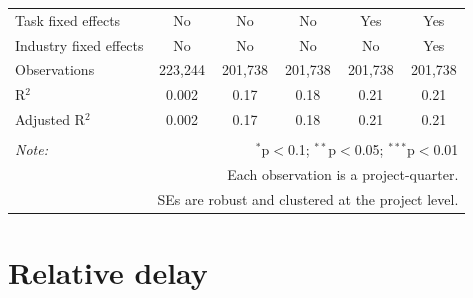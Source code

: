 \documentclass[
]{article}
\begin{document}
\begin{table}[H]
\begin{tabular}{@{\extracolsep{-2pt}}lccccc}
Task fixed effects & No & No & No & Yes & Yes \\ 
Industry fixed effects & No & No & No & No & Yes \\ 
Observations & 223,244 & 201,738 & 201,738 & 201,738 & 201,738 \\ 
R$^{2}$ & 0.002 & 0.17 & 0.18 & 0.21 & 0.21 \\ 
Adjusted R$^{2}$ & 0.002 & 0.17 & 0.18 & 0.21 & 0.21 \\ 
\hline 
\hline \\[-1.8ex] 
\textit{Note:}  & \multicolumn{5}{r}{$^{*}$p$<$0.1; $^{**}$p$<$0.05; $^{***}$p$<$0.01} \\ 
 & \multicolumn{5}{r}{Each observation is a project-quarter.} \\ 
 & \multicolumn{5}{r}{SEs are robust and clustered at the project level.} \\ 
\end{tabular} 
\end{table}

\hypertarget{relative-delay}{%
\section{Relative delay}\label{relative-delay}}
\end{document}
